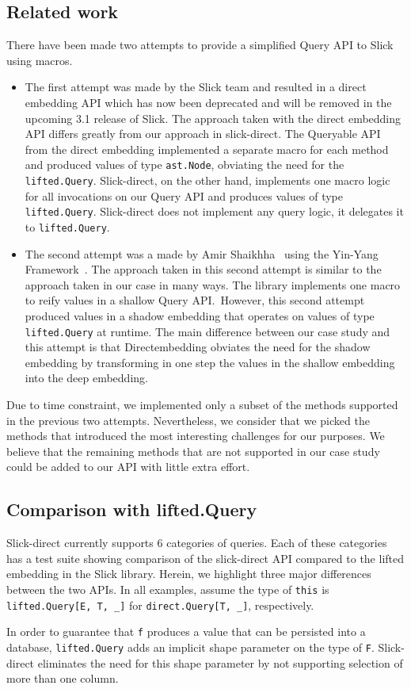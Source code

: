 \subsection{Related work} %
\label{sub:Relatedwork}
There have been made two attempts to provide a simplified Query API to Slick using macros.
\begin{itemize}
    \item The first attempt was made by the Slick team and resulted in a direct embedding API which has now been deprecated and will be removed in the upcoming 3.1 release of Slick.
        The approach taken with the direct embedding API differs greatly from our approach in slick-direct.
        The Queryable API from the direct embedding implemented a separate macro for each method and produced values of type \texttt{ast.Node}, obviating the need for the \texttt{lifted.Query}.
        Slick-direct, on the other hand, implements one macro logic for all invocations on our Query API and produces values of type \texttt{lifted.Query}.
        Slick-direct does not implement any query logic, it delegates it to \texttt{lifted.Query}.
    \item The second attempt was a made by Amir Shaikhha~\autocite{shaikhha_embedded_2014} using the Yin-Yang Framework~\autocite{jovanovic_yin-yang:_2014}.
        The approach taken in this second attempt is similar to the approach taken in our case in many ways.
        The library implements one macro to reify values in a shallow Query API.\
        However, this second attempt produced values in a shadow embedding that operates on values of type \texttt{lifted.Query} at runtime.
        The main difference between our case study and this attempt is that Directembedding obviates the need for the shadow embedding by transforming in one step the values in the shallow embedding into the deep embedding.
\end{itemize}
Due to time constraint, we implemented only a subset of the methods supported in the previous two attempts.
Nevertheless, we consider that we picked the methods that introduced the most interesting challenges for our purposes.
We believe that the remaining methods that are not supported in our case study could be added to our API with little extra effort.

\subsection{Comparison with lifted.Query} %
\label{sub:Comparisonwithlifted.Query}
Slick-direct currently supports 6 categories of queries.
Each of these categories has a test suite showing comparison of the slick-direct API compared to the lifted embedding in the Slick library.
Herein, we highlight three major differences between the two APIs.
In all examples, assume the type of \texttt{this} is \texttt{lifted.Query[E, T, \_]} for \texttt{direct.Query[T, \_]}, respectively.

In order to guarantee that \texttt{f} produces a value that can be persisted into a database, \texttt{lifted.Query} adds an implicit shape parameter on the type of \texttt{F}.
Slick-direct eliminates the need for this shape parameter by not supporting selection of more than one column.

